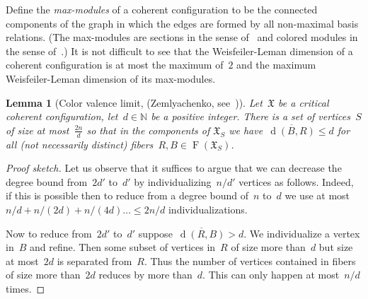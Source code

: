\documentclass[english,a4paper]{article}
\theoremstyle{plain}
\newtheorem{lemma}      [theorem]{Lemma}
\theoremstyle{definition}
\newcommand{\Nat}{\ensuremath{\mathbb{N}}}
\DeclareMathOperator{\Fibers}{F}
\newcommand{\coherentConfig}{\ensuremath{\mathfrak{X}}}
\newcommand{\fibers}[1]{\ensuremath{\Fibers \left( #1 \right)}}
\newcommand{\minimalDegree}[2]{\Deg(#1,#2)}
\DeclareMathOperator{\Deg}{d}
\begin{document}
Define the \emph{max-modules} of a coherent configuration to be the connected components of the graph in which the edges are formed by all non-maximal basis relations. (The max-modules are sections in the sense of~\cite{DBLP:journals/dam/Goldberg83} and colored modules in the sense of~\cite{DBLP:journals/mst/Schweitzer17}.)
It is not difficult to see that the Weisfeiler-Leman dimension of a coherent configuration is at most the maximum of~$2$ and the maximum Weisfeiler-Leman dimension of its max-modules.


\begin{lemma}[Color valence limit, (Zemlyachenko, see~\cite{DBLP:conf/fct/Babai81})]
\label{lem:bound-on-min:degree}
    Let~$\coherentConfig$ be a critical coherent configuration, let~$d \in \Nat$ be a positive integer.
    There is a set of vertices~$S$ of size at most~$\frac{2n}{d}$  so that in the components of
    $\coherentConfig_S$ we have~$\overline{\minimalDegree{B}{R}}\leq d$
     for all (not necessarily distinct) fibers~$R,B \in \fibers{\coherentConfig_S}$.
\end{lemma}
\begin{proof}[Proof sketch]
    Let us observe that it suffices to argue that we can decrease the degree bound from~$2d'$ to~$d'$ by individualizing~$n/d'$ vertices as follows. Indeed, if this is possible then to reduce from a degree bound of~$n$ to~$d$ we use at most~$n/d+n/(2d)+n/(4d)\ldots \leq 2n/d$ individualizations.

    Now to reduce from~$2d'$ to~$d'$ suppose~$\overline{\minimalDegree{R}{B}}>d$.
    We individualize a vertex in~$B$ and refine.
    Then some subset of vertices in~$R$ of size more than~$d$ but size at most~$2d$ is separated from~$R$. Thus the number of vertices contained in fibers of size more than~$2d$ reduces by more than~$d$. This can only happen at most~$n/d$ times.
\end{proof}
\end{document}
